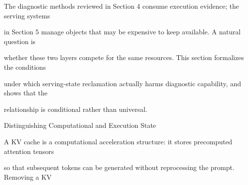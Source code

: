 \begin{flushleft}
\noindent The diagnostic methods reviewed in Section 4 consume execution evidence; the serving systems\par
\noindent in Section 5 manage objects that may be expensive to keep available. A natural question is\par
\noindent whether these two layers compete for the same resources. This section formalizes the conditions\par
\noindent under which serving-state reclamation actually harms diagnostic capability, and shows that the\par
\noindent relationship is conditional rather than universal.\par
\par\smallskip
{} Distinguishing Computational and Execution State\par
\noindent A KV cache is a computational acceleration structure: it stores precomputed attention tensors\par
\noindent so that subsequent tokens can be generated without reprocessing the prompt. Removing a KV\par
\end{flushleft}
